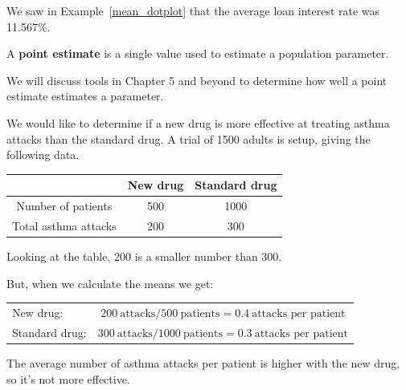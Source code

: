 \documentclass{beamer}
\begin{document}
\begin{frame}
\begin{example}
We saw in Example~\ref{mean_dotplot} that the average loan interest rate was 11.567\%.

\vspace{1mm}
\pause
{}\pause

\vspace{2mm}
\pause
{}
\end{example}\pause

\begin{definition}
A \textbf{point estimate} is a single value used to estimate a population parameter.
\end{definition}\pause

\begin{note}
We will discuss tools in Chapter 5 and beyond to determine how well a point estimate estimates a parameter.
\end{note}
\end{frame}

\begin{frame}
\begin{example}
We would like to determine if a new drug is more effective at treating asthma attacks than the standard drug. A trial of 1500 adults is setup, giving the following data.

\vspace{-5mm}
\begin{center}
\begin{tabular}{c|cc}
& New drug & Standard drug \\\hline
Number of patients & 500 & 1000 \\
Total asthma attacks & 200 & 300
\end{tabular}
\end{center}
\pause
{}\pause
 
 \vspace{1mm}
Looking at the table, 200 is a smaller number than 300. \pause

\vspace{1mm}
But, when we calculate the means we get:

\vspace{-4mm}
\begin{center}
\begin{tabular}{lc}
New drug: & $200~\text{attacks} / 500~\text{patients}=0.4~\text{attacks per patient}$ \\[2mm]
Standard drug: & $300~\text{attacks} / 1000~\text{patients}=0.3~\text{attacks per patient}$
\end{tabular}
\end{center}\pause
The average number of asthma attacks per patient is higher with the new drug, so it's not more effective.
\end{example}
\end{frame}
\end{document}
